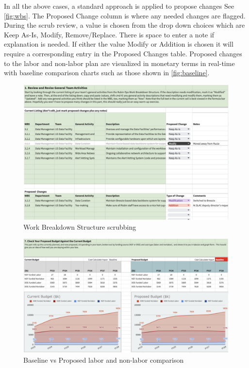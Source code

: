 In all the above cases, a standard approach is applied to propose changes See \autoref{fig:wbs}. The Proposed Change column is where any needed changes are flagged. During the scrub review, a value is chosen from the drop down choices which are Keep As-Is, Modify, Remove/Replace. There is space to enter a note if explanation is needed.
If either the value Modify or Addition is chosen it will require a corresponding entry in the Proposed Changes table.
Proposed changes to the labor and non-labor plan are visualized in monetary terms in real-time with baseline comparison charts such as those shown in \autoref{fig:baseline}.



\begin{figure}[h!]
\begin{centering}
\includegraphics[width=1.0\textwidth]{Figure4WorkBreakdownStructurescrubbing}
	\caption{ Work Breakdown Structure scrubbing
\label{fig:wbs}}
\end{centering}
\end{figure}

\begin{figure}[h!]
\begin{centering}
\includegraphics[width=1.0\textwidth]{Figure5BaselinevsProposed}
	\caption{Baseline vs Proposed labor and non-labor comparison
\label{fig:baseline}}
\end{centering}
\end{figure}

